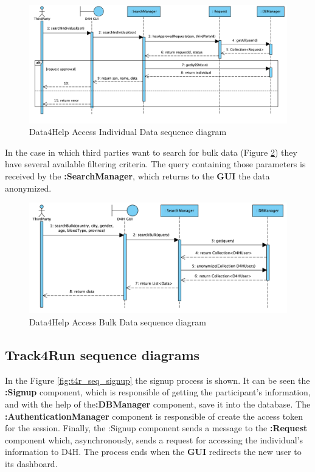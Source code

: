 \documentclass[a4paper, hidelinks, 12pt]{report}
\begin{document}
	\begin{figure}[H]
		\centering
		\includegraphics[width=1\textwidth]{diagrams/sequence_diagrams/d4h_access_individual_data.png}
		\caption[Data4Help Access Individual Data sequence diagram]{Data4Help Access Individual Data sequence diagram}
		\label{fig:d4h_access_individual_data}
	\end{figure}
	
	In the case in which third parties want to search for bulk data (Figure \ref{fig:d4h_access_bulk_data}) they have several available filtering criteria. The query containing those parameters is received by the \textbf{:SearchManager}, which returns to the \textbf{GUI} the data anonymized.
	
	\begin{figure}[H]
		\centering
		\includegraphics[width=1\textwidth]{diagrams/sequence_diagrams/d4h_access_bulk_data.png}
		\caption[Data4Help Access Bulk Data sequence diagram]{Data4Help Access Bulk Data sequence diagram}
		\label{fig:d4h_access_bulk_data}
	\end{figure}
	
	\subsection{Track4Run sequence diagrams}
	In the Figure \ref{fig:t4r_seq_signup} the signup process is shown. It can be seen the \textbf{:Signup} component, which is responsible of getting the participant's information, and with the help of the\textbf{:DBManager} component, save it into the database. The \textbf{:AuthenticationManager} component is responsible of create the access token for the session. Finally, the :Signup component sends a message to the \textbf{:Request} component which, asynchronously,  sends a request for accessing the individual's information to D4H. The process ends when the \textbf{GUI} redirects the new user to its dashboard.\\
	
\end{document}
